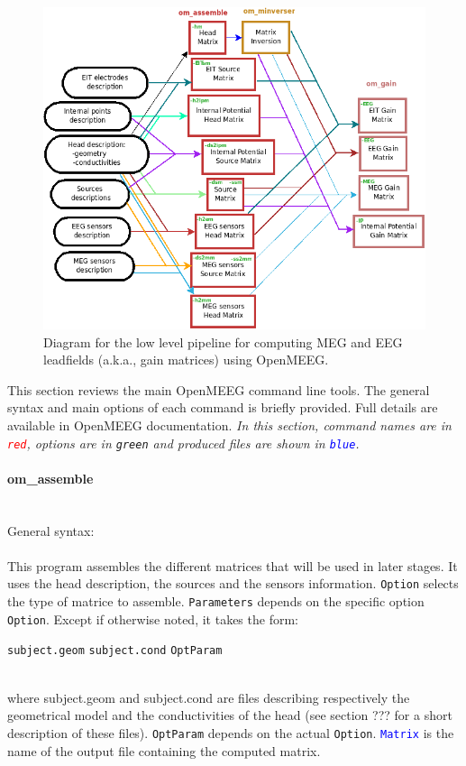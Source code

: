 \documentclass[10pt,journal]{book}
\newcommand{\command}[1]{\framebox[\textwidth][l]{\tt \$ #1}}
\newcommand{\commandTitle}[1]{\paragraph*{\textbf{#1}}\mbox{ }\\}
\newcommand{\commandName}[1]{\textcolor{red}{\tt #1}}
\newcommand{\optionName}[1]{\textcolor{OliveGreen}{\tt #1}}
\newcommand{\outputName}[1]{\textcolor{blue}{\tt #1}}
\newcommand{\Param}[1]{{\tt #1}}
\begin{document}
\begin{figure}[htbp]
    \centering
        \includegraphics[width=0.95\linewidth]{OpenMEEGSimple}
    \caption{Diagram for the low level pipeline for computing MEG and EEG leadfields (a.k.a., gain matrices) using OpenMEEG.}
    \label{fig:img_OpenMEEGSimple}
\end{figure}


This section reviews the main OpenMEEG command line tools. The general syntax and main options of each command is briefly provided.
Full details are available in OpenMEEG documentation. \emph{In this section, command names are in \commandName{red}, options are in \optionName{green} and produced files are shown in \outputName{blue}.}

    \newpage

    \commandTitle{om\_assemble}
        General syntax:\\[2mm]
        \command{\commandName{om\_assemble} \optionName{Option} \optionName{Parameters} \outputName{Matrix}}\\[2mm]
        This program assembles the different matrices that will be used in
        later stages. It uses the head description, the sources and the sensors information. \optionName{Option} selects the type of matrice to assemble.
        \optionName{Parameters} depends on the specific option \optionName{Option}.
        Except if otherwise noted, it takes the form:\\
        \centerline{\Param{subject.geom} \Param{subject.cond} \optionName{OptParam}}\\
        where subject.geom and subject.cond are files describing respectively the geometrical model and the conductivities of the head (see section ???
        for a short description of these files). \optionName{OptParam} depends on the actual \optionName{Option}. \outputName{Matrix} is the name of the output file
        containing the computed matrix.
\end{document}
